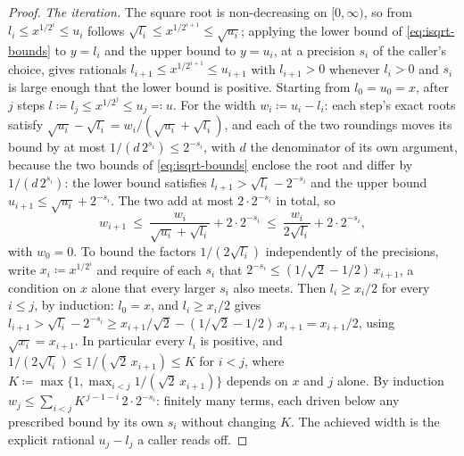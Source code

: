 \begin{proof}
\emph{The iteration.} The square root is non-decreasing on $[0,\infty)$, so
from $l_i\le x^{1/2^{i}}\le u_i$ follows $\sqrt{l_i}\le x^{1/2^{i+1}}\le
\sqrt{u_i}$; applying the lower bound of \eqref{eq:isqrt-bounds} to
$y=l_i$ and the upper bound to $y=u_i$, at a precision $s_i$ of the caller's
choice, gives rationals $l_{i+1}\le x^{1/2^{i+1}}\le u_{i+1}$ with
$l_{i+1}>0$ whenever $l_i>0$ and $s_i$ is large enough that the lower bound
is positive. Starting from $l_0=u_0=x$, after $j$ steps
$l\coloneqq l_j\le x^{1/2^{j}}\le u_j\eqqcolon u$. For the width
$w_i\coloneqq u_i-l_i$: each step's exact roots satisfy
$\sqrt{u_i}-\sqrt{l_i}=w_i/(\sqrt{u_i}+\sqrt{l_i})$, and each of the two
roundings moves its bound by at most $1/(d\,2^{s_i})\le2^{-s_i}$, with $d$
the denominator of its own argument, because the two bounds of
\eqref{eq:isqrt-bounds} enclose the root and differ by $1/(d\,2^{s_i})$: the
lower bound satisfies $l_{i+1}>\sqrt{l_i}-2^{-s_i}$ and the upper bound
$u_{i+1}\le\sqrt{u_i}+2^{-s_i}$. The two add at most $2\cdot2^{-s_i}$ in
total, so
\begin{equation*}
  w_{i+1}\ \le\ \frac{w_i}{\sqrt{u_i}+\sqrt{l_i}}+2\cdot2^{-s_i}
  \ \le\ \frac{w_i}{2\sqrt{l_i}}+2\cdot2^{-s_i},
\end{equation*}
with $w_0=0$. To bound the factors $1/(2\sqrt{l_i})$ independently of the
precisions, write $x_i\coloneqq x^{1/2^{i}}$ and require of each $s_i$ that
$2^{-s_i}\le(1/\sqrt2-1/2)\,x_{i+1}$, a condition on $x$ alone that every
larger $s_i$ also meets. Then $l_i\ge x_i/2$ for every $i\le j$, by
induction: $l_0=x$, and $l_i\ge x_i/2$ gives
$l_{i+1}>\sqrt{l_i}-2^{-s_i}\ge x_{i+1}/\sqrt2-(1/\sqrt2-1/2)\,x_{i+1}
=x_{i+1}/2$, using $\sqrt{x_i}=x_{i+1}$. In particular every $l_i$ is
positive, and $1/(2\sqrt{l_i})\le1/(\sqrt2\,x_{i+1})\le K$ for $i<j$, where
$K\coloneqq\max\{1,\max_{i<j}1/(\sqrt2\,x_{i+1})\}$ depends on $x$ and $j$
alone. By induction
$w_j\le\sum_{i<j}K^{\,j-1-i}\,2\cdot2^{-s_i}$: finitely many terms, each
driven below any prescribed bound by its own $s_i$ without changing $K$. The
achieved width is the explicit rational $u_j-l_j$ a caller reads off.
\end{proof}
